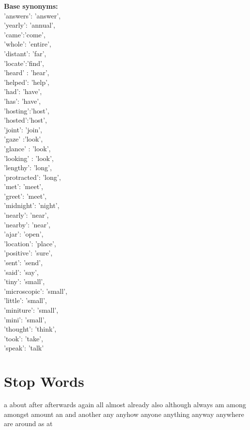 \documentclass[../embeddings.tex]{subfiles}
\begin{document}
\textbf{Base synonyms:}\\
    'answers': 'answer',\\
    'yearly': 'annual',\\
    'came':'come',\\
    'whole': 'entire',\\
    'distant': 'far',\\
    'locate':'find',\\
    'heard' : 'hear',\\
    'helped': 'help',\\
    'had': 'have',\\
    'has': 'have',\\
    'hosting':'host',\\
    'hosted':'host',\\
    'joint': 'join',\\
    'gaze' :'look',\\
    'glance' : 'look',\\
    'looking' : 'look',\\
    'lengthy': 'long',\\
    'protracted': 'long',\\
    'met': 'meet',\\
    'greet': 'meet',\\
    'midnight': 'night',\\
    'nearly': 'near',\\
    'nearby': 'near',\\
    'ajar': 'open',\\
    'location': 'place',\\
    'positive': 'sure',\\
    'sent': 'send',\\
    'said': 'say',\\
    'tiny': 'small',\\
    'microscopic': 'small',\\
    'little': 'small',\\
    'miniture': 'small',\\
    'mini': 'small',\\
    'thought': 'think',\\
    'took': 'take',\\
    'speak': 'talk'

\section{Stop Words}
a about after afterwards again all almost
already also although always am among amongst amount an and another any anyhow
anyone anything anyway anywhere are around as at
\end{document}
